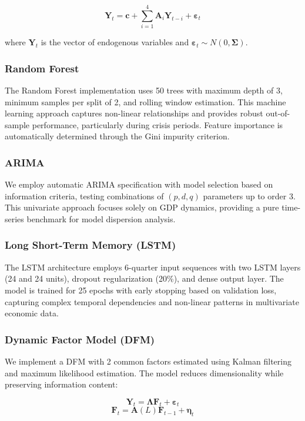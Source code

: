\documentclass[5p,authoryear]{elsarticle}
\begin{document}
$$\mathbf{Y}_t = \mathbf{c} + \sum_{i=1}^{4} \mathbf{A}_i \mathbf{Y}_{t-i} + \boldsymbol{\varepsilon}_t$$

where $\mathbf{Y}_t$ is the vector of endogenous variables and $\boldsymbol{\varepsilon}_t \sim N(0, \boldsymbol{\Sigma})$.

\subsubsection{Random Forest}
The Random Forest implementation uses 50 trees with maximum depth of 3, minimum samples per split of 2, and rolling window estimation. This machine learning approach captures non-linear relationships and provides robust out-of-sample performance, particularly during crisis periods. Feature importance is automatically determined through the Gini impurity criterion.

\subsubsection{ARIMA}
We employ automatic ARIMA specification with model selection based on information criteria, testing combinations of $(p,d,q)$ parameters up to order 3. This univariate approach focuses solely on GDP dynamics, providing a pure time-series benchmark for model dispersion analysis.

\subsubsection{Long Short-Term Memory (LSTM)}
The LSTM architecture employs 6-quarter input sequences with two LSTM layers (24 and 24 units), dropout regularization (20\%), and dense output layer. The model is trained for 25 epochs with early stopping based on validation loss, capturing complex temporal dependencies and non-linear patterns in multivariate economic data.

\subsubsection{Dynamic Factor Model (DFM)}
We implement a DFM with 2 common factors estimated using Kalman filtering and maximum likelihood estimation. The model reduces dimensionality while preserving information content:

$$\mathbf{Y}_t = \boldsymbol{\Lambda} \mathbf{F}_t + \boldsymbol{\varepsilon}_t$$
$$\mathbf{F}_t = \mathbf{A}(L) \mathbf{F}_{t-1} + \boldsymbol{\eta}_t$$
\end{document}
